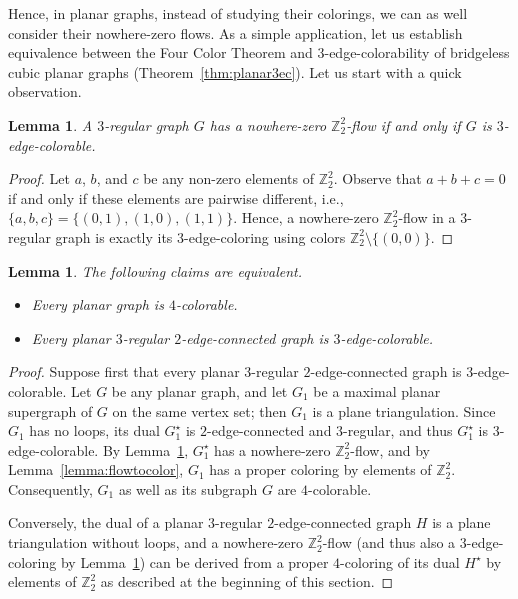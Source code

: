 \documentclass[12pt,twoside,openright,a4paper]{book}
\newtheorem{lemma}[theorem]{Lemma}
\begin{document}
Hence, in planar graphs, instead of studying their colorings, we can as well consider their nowhere-zero flows.
As a simple application, let us establish equivalence between the Four Color Theorem and $3$-edge-colorability of bridgeless
cubic planar graphs (Theorem~\ref{thm:planar3ec}).  Let us start with a quick observation.
\begin{lemma}\label{lemma:z223col}
A $3$-regular graph $G$ has a nowhere-zero $\mathbb{Z}_2^2$-flow if and only if $G$ is $3$-edge-colorable.
\end{lemma}
\begin{proof}
Let $a$, $b$, and $c$ be any non-zero elements of $\mathbb{Z}_2^2$.  Observe that $a+b+c=0$ if and only if these
elements are pairwise different, i.e., $\{a,b,c\}=\{(0,1),(1,0),(1,1)\}$.  Hence, a nowhere-zero $\mathbb{Z}_2^2$-flow
in a $3$-regular graph is exactly its $3$-edge-coloring using colors $\mathbb{Z}_2^2\setminus\{(0,0)\}$.
\end{proof}

\begin{lemma}\label{lemma:4cec}
The following claims are equivalent.
\begin{itemize}
\item Every planar graph is $4$-colorable.
\item Every planar $3$-regular $2$-edge-connected graph is $3$-edge-colorable.
\end{itemize}
\end{lemma}
\begin{proof}
Suppose first that every planar $3$-regular $2$-edge-connected graph is $3$-edge-colorable.  Let $G$ be any planar graph,
and let $G_1$ be a maximal planar supergraph of $G$ on the same vertex set; then $G_1$ is a plane triangulation.  Since $G_1$
has no loops, its dual $G_1^\star$ is $2$-edge-connected and $3$-regular, and thus $G_1^\star$ is $3$-edge-colorable.  By Lemma~\ref{lemma:z223col},
$G_1^\star$ has a nowhere-zero $\mathbb{Z}_2^2$-flow, and by Lemma~\ref{lemma:flowtocolor}, $G_1$ has a proper coloring by elements of $\mathbb{Z}_2^2$.
Consequently, $G_1$ as well as its subgraph $G$ are $4$-colorable.

Conversely, the dual of a planar $3$-regular $2$-edge-connected graph $H$ is a plane triangulation without loops, and a nowhere-zero
$\mathbb{Z}_2^2$-flow (and thus also a $3$-edge-coloring by Lemma~\ref{lemma:z223col}) can be derived from a proper $4$-coloring
of its dual $H^\star$ by elements of $\mathbb{Z}_2^2$ as described at the beginning of this section.
\end{proof}
\end{document}
